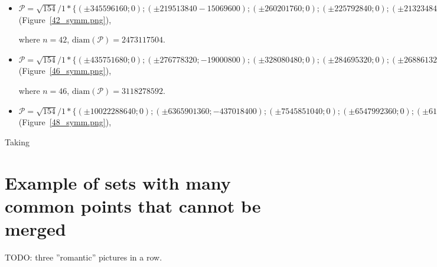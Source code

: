 \documentclass[12pt]{article}
\theoremstyle{theorem}
\theoremstyle{dfn}
\theoremstyle{remark}
\begin{document}
\begin{itemize}
\setlength{\itemsep}{-1mm}


\item
$\mathcal{P}=\sqrt{154}/{1} * \{ (\pm 345596160; 0);
(\pm219513840 -15069600);
(\pm260201760; 0);
(\pm225792840; 0);
(\pm213234840; 0);
(\pm153961080; 0);
(\pm144668160; 0
(\pm25116000; 0);
(\pm694026840; 0);
(\pm514710560; 0);
(\pm359116940; 0);
(\pm13423904; 0);
(\pm75682880; 0);
(\pm464143680; 0);
(\pm827069880; 0);
(\pm92144325; 0);
(\pm1195180740; 0);
(\pm1236558752; 0);
(\pm44590560; 0);
(\pm339925740; 0);
(\pm117312468; 0)\}
$
(Figure~\ref{42_symm.png}),

where $n = 42$, $\operatorname{diam(\mathcal{P})} = 2473117504$.


\item
$\mathcal{P}=\sqrt{154}/{1} * \{ (\pm435751680; 0);
(\pm276778320; -19000800);
(\pm328080480; 0);
(\pm284695320; 0);
(\pm268861320; 0);
(\pm194124840; 0);
(\pm182407680; 0);
(\pm31668000; 0);
(\pm1559139296; 0);
(\pm1506967020; 0);
(\pm1042827240; 0);
(\pm875077320; 0);
(\pm648982880; 0);
(\pm585224640; 0);
(\pm452799620; 0);
(\pm95426240; 0);
(\pm16925792; 0);
(\pm116181975; 0);
(\pm428602020; 0);
(\pm56222880; 0);
(\pm769560480; 0);
(\pm626458560; 0);
(\pm130761918; 0)\}
$
(Figure~\ref{46_symm.png}),

where $n = 46$, $\operatorname{diam(\mathcal{P})} = 3118278592$.

\item
$\mathcal{P}=\sqrt{154}/{1} * \{ (\pm10022288640; 0);
( \pm6365901360 ; -437018400);
( \pm7545851040 ; 0);
( \pm6547992360 ; 0);
( \pm6183810360 ; 0);
( \pm4464871320 ; 0);
( \pm4195376640 ; 0);
( \pm728364000 ; 0);
( \pm35860203808 ; 0);
( \pm34660241460 ; 0);
( \pm23985026520 ; 0);
( \pm20126778360 ; 0);
( \pm14926606240 ; 0);
( \pm13460166720 ; 0);
( \pm10414391260 ; 0);
( \pm2194803520 ; 0);
( \pm389293216 ; 0);
( \pm2672185425 ; 0);
( \pm9857846460 ; 0);
( \pm1293126240 ; 0);
( \pm17699891040 ; 0);
( \pm14408546880 ; 0);
( \pm3007524114 ; 0);
( \pm3402061572 ; 0)\}
$
(Figure~\ref{48_symm.png}),

\end{itemize}

Taking

\section{Example of sets with many common points that cannot be merged}

TODO: three ''romantic'' pictures in a row.
\end{document}
